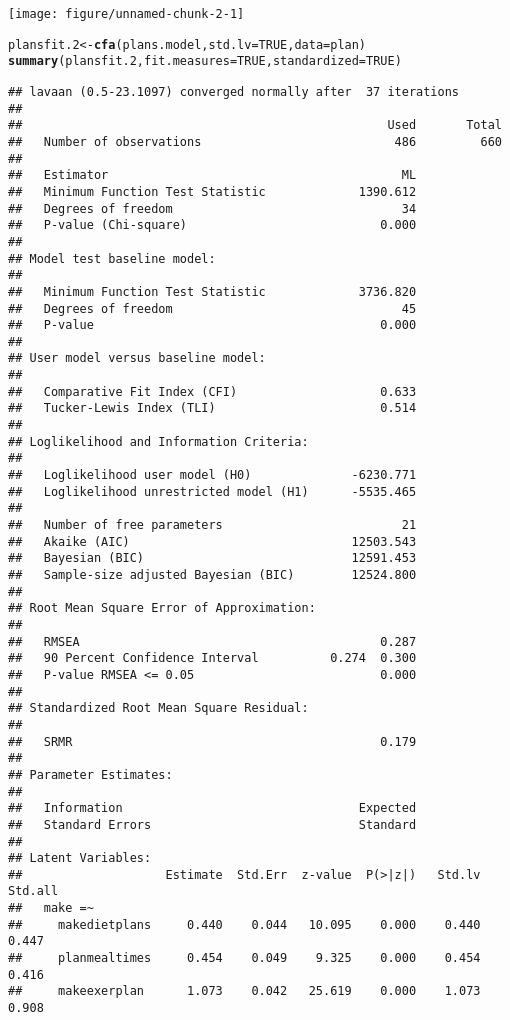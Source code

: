 \documentclass{article}\usepackage[]{graphicx}\usepackage[]{color}
\makeatletter
\def\maxwidth{ %
  \ifdim\Gin@nat@width>\linewidth
    \linewidth
  \else
    \Gin@nat@width
  \fi
}
\newcommand{\hlnum}[1]{\textcolor[rgb]{0.686,0.059,0.569}{#1}}%
\newcommand{\hlstd}[1]{\textcolor[rgb]{0.345,0.345,0.345}{#1}}%
\newcommand{\hlkwb}[1]{\textcolor[rgb]{0.69,0.353,0.396}{#1}}%
\newcommand{\hlkwc}[1]{\textcolor[rgb]{0.333,0.667,0.333}{#1}}%
\newcommand{\hlkwd}[1]{\textcolor[rgb]{0.737,0.353,0.396}{\textbf{#1}}}%
\newenvironment{kframe}{%
 \def\at@end@of@kframe{}%
 \ifinner\ifhmode%
  \def\at@end@of@kframe{\end{minipage}}%
  \begin{minipage}{\columnwidth}%
 \fi\fi%
 \def\FrameCommand##1{\hskip\@totalleftmargin \hskip-\fboxsep
 \colorbox{shadecolor}{##1}\hskip-\fboxsep
     \hskip-\linewidth \hskip-\@totalleftmargin \hskip\columnwidth}%
 \MakeFramed {\advance\hsize-\width
   \@totalleftmargin\z@ \linewidth\hsize
   \@setminipage}}%
 {\par\unskip\endMakeFramed%
 \at@end@of@kframe}
\newenvironment{knitrout}{}{} %
\makeatother
\begin{document}
\begin{knitrout}
\texttt{[image: figure/unnamed-chunk-2-1]} 
\begin{kframe}\begin{alltt}
\hlstd{plansfit.2} \hlkwb{<-} \hlkwd{cfa}\hlstd{(plans.model,} \hlkwc{std.lv} \hlstd{=} \hlnum{TRUE}\hlstd{,} \hlkwc{data} \hlstd{= plan)}
\hlkwd{summary}\hlstd{(plansfit.2,} \hlkwc{fit.measures} \hlstd{=} \hlnum{TRUE}\hlstd{,} \hlkwc{standardized} \hlstd{=} \hlnum{TRUE}\hlstd{)}
\end{alltt}
\begin{verbatim}
## lavaan (0.5-23.1097) converged normally after  37 iterations
## 
##                                                   Used       Total
##   Number of observations                           486         660
## 
##   Estimator                                         ML
##   Minimum Function Test Statistic             1390.612
##   Degrees of freedom                                34
##   P-value (Chi-square)                           0.000
## 
## Model test baseline model:
## 
##   Minimum Function Test Statistic             3736.820
##   Degrees of freedom                                45
##   P-value                                        0.000
## 
## User model versus baseline model:
## 
##   Comparative Fit Index (CFI)                    0.633
##   Tucker-Lewis Index (TLI)                       0.514
## 
## Loglikelihood and Information Criteria:
## 
##   Loglikelihood user model (H0)              -6230.771
##   Loglikelihood unrestricted model (H1)      -5535.465
## 
##   Number of free parameters                         21
##   Akaike (AIC)                               12503.543
##   Bayesian (BIC)                             12591.453
##   Sample-size adjusted Bayesian (BIC)        12524.800
## 
## Root Mean Square Error of Approximation:
## 
##   RMSEA                                          0.287
##   90 Percent Confidence Interval          0.274  0.300
##   P-value RMSEA <= 0.05                          0.000
## 
## Standardized Root Mean Square Residual:
## 
##   SRMR                                           0.179
## 
## Parameter Estimates:
## 
##   Information                                 Expected
##   Standard Errors                             Standard
## 
## Latent Variables:
##                    Estimate  Std.Err  z-value  P(>|z|)   Std.lv  Std.all
##   make =~                                                               
##     makedietplans     0.440    0.044   10.095    0.000    0.440    0.447
##     planmealtimes     0.454    0.049    9.325    0.000    0.454    0.416
##     makeexerplan      1.073    0.042   25.619    0.000    1.073    0.908

\end{verbatim}
\end{kframe}
\end{knitrout}
\end{document}
